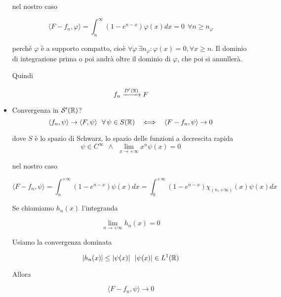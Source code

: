 \begin{itemize}
nel nostro caso

\begin{equation*}
\langle F - f_{n} ,\varphi \rangle = \int ^{\infty }_{n}\left(1 - e^{n - x}\right) \varphi (x)dx = 0\ \ \forall n\geq n_{\varphi }
\end{equation*}

perché $\varphi $ è a supporto compatto, cioè $\forall \varphi \ \exists n_{\varphi } :\varphi (x) = 0,\forall x\geq n$. Il dominio di integrazione prima o poi andrà oltre il dominio di $\varphi $, che poi si annullerà.

Quindi

\begin{equation*}
f_{n}\xrightarrow{D'(\mathbb{R})} F
\end{equation*}
\item Convergenza in $\mathcal{S}  '(\mathbb{R})$?
\begin{equation*}
\langle f_{n} ,\psi \rangle \rightarrow \langle F,\psi \rangle \ \ \forall \psi \in S(\RR) \ \ \iff \ \ \langle F - f_{n} ,\psi \rangle \rightarrow 0
\end{equation*}

dove $S$ è lo spazio di Schwarz, lo spazio delle funzioni a decrescita rapida
\begin{equation*}
\psi \in C^{\infty } \ \ \land \ \ \lim\limits _{x\rightarrow + \infty } x^{n} \psi (x) = 0
\end{equation*}

nel nostro caso

\begin{equation*}
\langle F - f_{n} ,\psi \rangle = \int ^{ + \infty }_{n}\left(1 - e^{n - x}\right) \psi (x) dx = \int ^{ + \infty }_{0}\left(1 - e^{n - x}\right) \chi _{(n, + \infty)}(x) \psi (x) dx
\end{equation*}

Se chiamiamo $h_{n}(x)$ l'integranda

\begin{equation*}
\lim\limits _{n\rightarrow + \infty } h_{n}(x) = 0
\end{equation*}

Usiamo la convergenza dominata

\begin{equation*}
| h_{n}(x)| \leq | \psi (x)| \ \ | \psi (x)| \in L^{1}(\mathbb{R})
\end{equation*}

Allora

\begin{equation*}
\langle F - f_{n} ,\psi \rangle \rightarrow 0
\end{equation*}
\end{itemize}
